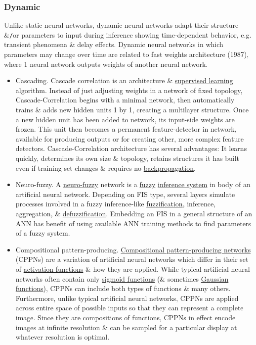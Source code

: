 \documentclass{article}
\begin{document}
\subsubsection{Dynamic}
Unlike static neural networks, dynamic neural networks adapt their structure \&{\tt/}or parameters to input during inference showing time-dependent behavior, e.g. transient phenomena \& delay effects. Dynamic neural networks in which parameters may change over time are related to fast weights architecture (1987), where 1 neural network outputs weights of another neural network.
\begin{itemize}
	\item {\sc Cascading.} Cascade correlation is an architecture \& \href{https://en.wikipedia.org/wiki/Supervised_learning}{supervised learning} algorithm. Instead of just adjusting weights in a network of fixed topology, Cascade-Correlation begins with a minimal network, then automatically trains \& adds new hidden units 1 by 1, creating a multilayer structure. Once a new hidden unit has been added to network, its input-side weights are frozen. This unit then becomes a permanent feature-detector in network, available for producing outputs or for creating other, more complex feature detectors. Cascade-Correlation architecture has several advantages: It learns quickly, determines its own size \& topology, retains structures it has built even if training set changes \& requires no \href{https://en.wikipedia.org/wiki/Back-propagation}{backpropagation}.
	\item {\sf Neuro-fuzzy.} A \href{https://en.wikipedia.org/wiki/Neuro-fuzzy}{neuro-fuzzy} network is a \href{https://en.wikipedia.org/wiki/Fuzzy_logic}{fuzzy} \href{https://en.wikipedia.org/wiki/Inference_system}{inference system} in body of an artificial neural network. Depending on FIS type, several layers simulate processes involved in a fuzzy inference-like \href{https://en.wikipedia.org/wiki/Fuzzification}{fuzzification}, inference, aggregation, \& \href{https://en.wikipedia.org/wiki/Defuzzification}{defuzzification}. Embedding an FIS in a general structure of an ANN has benefit of using available ANN training methods to find parameters of a fuzzy system.
	\item {\sf Compositional pattern-producing.} \href{https://en.wikipedia.org/wiki/Compositional_pattern-producing_network}{Compositional pattern-producing networks} (CPPNs) are a variation of artificial neural networks which differ in their set of \href{https://en.wikipedia.org/wiki/Activation_function}{activation functions} \& how they are applied. While typical artificial neural networks often contain only \href{https://en.wikipedia.org/wiki/Sigmoid_function}{sigmoid functions} (\& sometimes \href{https://en.wikipedia.org/wiki/Gaussian_function}{Gaussian functions}), CPPNs can include both types of functions \& many others. Furthermore, unlike typical artificial neural networks, CPPNs are applied across entire space of possible inputs so that they can represent a complete image. Since they are compositions of functions, CPPNs in effect encode images at infinite resolution \& can be sampled for a particular display at whatever resolution is optimal.
\end{itemize}
\end{document}
